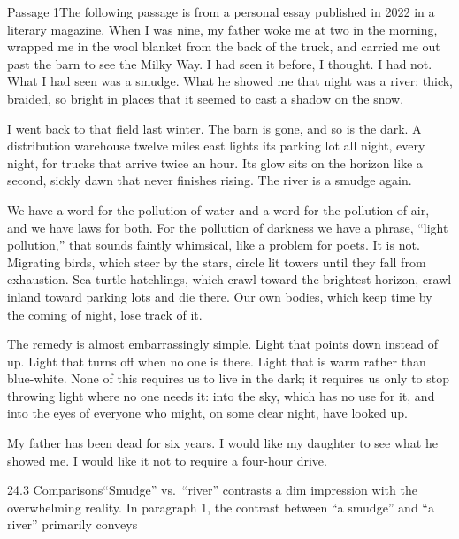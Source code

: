 \documentclass[11pt]{article}
\begin{document}
\begin{passage}{Passage 1}{The following passage is from a personal essay published in 2022 in a literary magazine.}
 When I was nine, my father woke me at two in the morning, wrapped me in the wool blanket from the back of the truck, and carried me out past the barn to see the Milky Way. I had seen it before, I thought. I had not. What I had seen was a smudge. What he showed me that night was a river: thick, braided, so bright in places that it seemed to cast a shadow on the snow.

 I went back to that field last winter. The barn is gone, and so is the dark. A distribution warehouse twelve miles east lights its parking lot all night, every night, for trucks that arrive twice an hour. Its glow sits on the horizon like a second, sickly dawn that never finishes rising. The river is a smudge again.

 We have a word for the pollution of water and a word for the pollution of air, and we have laws for both. For the pollution of darkness we have a phrase, ``light pollution,'' that sounds faintly whimsical, like a problem for poets. It is not. Migrating birds, which steer by the stars, circle lit towers until they fall from exhaustion. Sea turtle hatchlings, which crawl toward the brightest horizon, crawl inland toward parking lots and die there. Our own bodies, which keep time by the coming of night, lose track of it.

 The remedy is almost embarrassingly simple. Light that points down instead of up. Light that turns off when no one is there. Light that is warm rather than blue-white. None of this requires us to live in the dark; it requires us only to stop throwing light where no one needs it: into the sky, which has no use for it, and into the eyes of everyone who might, on some clear night, have looked up.

 My father has been dead for six years. I would like my daughter to see what he showed me. I would like it not to require a four-hour drive.
\end{passage}

\begin{q}{2}{4.3 Comparisons}{``Smudge'' vs.\ ``river'' contrasts a dim impression with the overwhelming reality.}
In paragraph 1, the contrast between ``a smudge'' and ``a river'' primarily conveys
\end{q}
\end{document}
